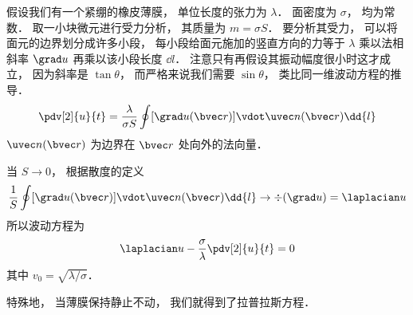 
\begin{issues}
\issueDraft
\end{issues}


假设我们有一个紧绷的橡皮薄膜， 单位长度的张力为 $\lambda$． 面密度为 $\sigma$， 均为常数． 取一小块微元进行受力分析， 其质量为 $m = \sigma S$． 要分析其受力， 可以将面元的边界划分成许多小段， 每小段给面元施加的竖直方向的力等于 $\lambda$ 乘以法相斜率 $\grad u$ 再乘以该小段长度 $\dd{l}$． 注意只有再假设其振动幅度很小时这才成立， 因为斜率是 $\tan\theta$， 而严格来说我们需要 $\sin\theta$， 类比同一维波动方程的推导．
\begin{equation}
\pdv[2]{u}{t} = \frac{\lambda}{\sigma S}\oint [\grad u(\bvec r)] \vdot \uvec n(\bvec r) \dd{l}
\end{equation}
$\uvec n(\bvec r)$ 为边界在 $\bvec r$ 处向外的法向量．

当 $S \to 0$， 根据散度的定义
\begin{equation}
\frac{1}{S} \oint [\grad u(\bvec r)] \vdot \uvec n(\bvec r) \dd{l} \to \div (\grad u) = \laplacian u
\end{equation}
所以波动方程为
\begin{equation}
\laplacian u - \frac{\sigma}{\lambda}\pdv[2]{u}{t} = 0
\end{equation}
其中 $v_0 = \sqrt{\lambda/\sigma}$．

特殊地， 当薄膜保持静止不动， 我们就得到了拉普拉斯方程．
